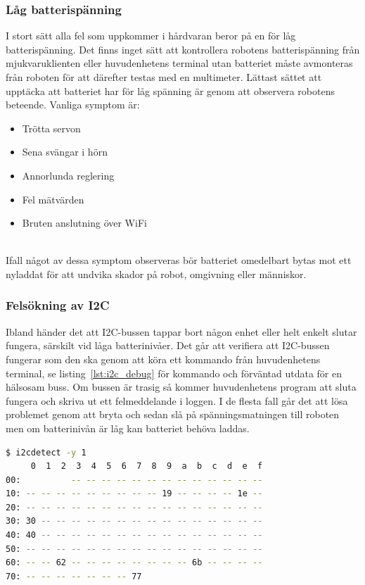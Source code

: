 \documentclass{article}
\begin{document}
\subsubsection{Låg batterispänning}
I stort sätt alla fel som uppkommer i hårdvaran beror på en för låg batterispänning. Det finns inget sätt att kontrollera robotens batterispänning från mjukvaruklienten eller huvudenhetens terminal utan batteriet måste avmonteras från roboten för att därefter testas med en multimeter. Lättast sättet att upptäcka att batteriet har för låg spänning är genom att observera robotens beteende. Vanliga symptom är:

\begin{itemize}
    \item Trötta servon
    \item Sena svängar i hörn
    \item Annorlunda reglering
    \item Fel mätvärden
    \item Bruten anslutning över WiFi
\end{itemize}
\ \\
Ifall något av dessa symptom observeras bör batteriet omedelbart bytas mot ett nyladdat för att undvika skador på robot, omgivning eller människor.

\subsubsection{Felsökning av I2C}
Ibland händer det att I2C-bussen tappar bort någon enhet eller helt enkelt slutar fungera, särskilt vid låga batterinivåer. Det går att verifiera att I2C-bussen fungerar som den ska genom att köra ett kommando från huvudenhetens terminal, se listing~\ref{lst:i2c_debug} för kommando och förväntad utdata för en hälsosam buss. Om bussen är trasig så kommer huvudenhetens program att sluta fungera och skriva ut ett felmeddelande i loggen. I de flesta fall går det att lösa problemet genom att bryta och sedan slå på spänningsmatningen till roboten men om batterinivån är låg kan batteriet behöva laddas.
\newline
\begin{lstlisting}[language=sh, label={lst:i2c_debug}, caption={Kommando och förväntad utdata för en fungerande I2C-buss}]
$ i2cdetect -y 1
     0  1  2  3  4  5  6  7  8  9  a  b  c  d  e  f
00:          -- -- -- -- -- -- -- -- -- -- -- -- --
10: -- -- -- -- -- -- -- -- -- 19 -- -- -- -- 1e --
20: -- -- -- -- -- -- -- -- -- -- -- -- -- -- -- --
30: 30 -- -- -- -- -- -- -- -- -- -- -- -- -- -- --
40: 40 -- -- -- -- -- -- -- -- -- -- -- -- -- -- --
50: -- -- -- -- -- -- -- -- -- -- -- -- -- -- -- --
60: -- -- 62 -- -- -- -- -- -- -- -- 6b -- -- -- --
70: -- -- -- -- -- -- -- 77
\end{lstlisting}
\end{document}
